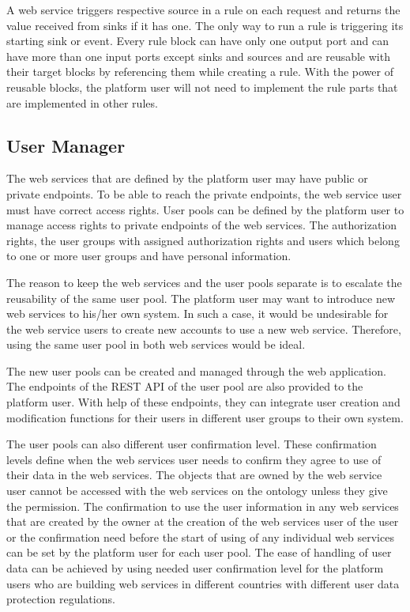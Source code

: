  A web service triggers respective source in a rule on each request and returns the value received from sinks if it has one. The only way to run a rule is triggering its starting sink or event. Every rule block can have only one output port and can have more than one input ports except sinks and sources and are reusable with their target blocks by referencing them while creating a rule. With the power of reusable blocks, the platform user will not need to implement the rule parts that are implemented in other rules.

\subsection{User Manager}

The web services that are defined by the platform user may have public or private endpoints. To be able to reach the private endpoints, the web service user must have correct access rights. User pools can be defined by the platform user to manage access rights to private endpoints of the web services. The authorization rights, the user groups with assigned authorization rights and users which belong to one or more user groups and have personal information. 

The reason to keep the web services and the user pools separate is to escalate the reusability of the same user pool. The platform user may want to introduce new web services to his/her own system. In such a case, it would be undesirable for the web service users to create new accounts to use a new web service. Therefore, using the same user pool in both web services would be ideal. 

The new user pools can be created and managed through the web application. The endpoints of the REST API of the user pool are also provided to the platform user. With help of these endpoints, they can integrate user creation and modification functions for their users in different user groups to their own system. 

The user pools can also different user confirmation level. These confirmation levels define when the web services user needs to confirm they agree to use of their data in the web services. The objects that are owned by the web service user cannot be accessed with the web services on the ontology unless they give the permission. The confirmation to use the user information in any web services that are created by the owner at the creation of the web services user of the user or the confirmation need before the start of using of any individual web services can be set by the platform user for each user pool. The ease of handling of user data can be achieved by using needed user confirmation level for the platform users who are building web services in different countries with different user data protection regulations.


